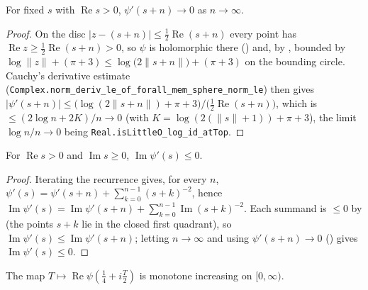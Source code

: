 \begin{lemma}
\label{lem:ga_trigamma_decay}
\leanok
{}
For fixed $s$ with $\operatorname{Re}s>0$, $\psi'(s+n)\to0$ as $n\to\infty$.
\end{lemma}

\begin{proof}
\leanok
{}
On the disc $\lvert z-(s+n)\rvert\le\tfrac12\operatorname{Re}(s+n)$ every point has
$\operatorname{Re}z\ge\tfrac12\operatorname{Re}(s+n)>0$, so $\psi$ is holomorphic there
() and, by , bounded by
$\log\lVert z\rVert+(\pi+3)\le\log\!\bigl(2\lVert s+n\rVert\bigr)+(\pi+3)$ on the bounding circle.
Cauchy's derivative estimate (\texttt{Complex.norm\_deriv\_le\_of\_forall\_mem\_sphere\_norm\_le})
then gives $\lvert\psi'(s+n)\rvert\le\bigl(\log(2\lVert s+n\rVert)+\pi+3\bigr)/\bigl(\tfrac12\operatorname{Re}(s+n)\bigr)$,
which is $\le(2\log n+2K)/n\to0$ (with $K=\log(2(\lVert s\rVert+1))+\pi+3$), the limit
$\log n/n\to0$ being \texttt{Real.isLittleO\_log\_id\_atTop}.
\end{proof}

\begin{lemma}
\label{lem:ga_im_trigamma_nonpos}
\leanok
{}
For $\operatorname{Re}s>0$ and $\operatorname{Im}s\ge0$, $\operatorname{Im}\psi'(s)\le0$.
\end{lemma}

\begin{proof}
\leanok
{}
Iterating the recurrence  gives, for every $n$,
$\psi'(s)=\psi'(s+n)+\sum_{k=0}^{n-1}(s+k)^{-2}$, hence
$\operatorname{Im}\psi'(s)=\operatorname{Im}\psi'(s+n)+\sum_{k=0}^{n-1}\operatorname{Im}(s+k)^{-2}$.
Each summand is $\le0$ by  (the points $s+k$ lie in the closed
first quadrant), so $\operatorname{Im}\psi'(s)\le\operatorname{Im}\psi'(s+n)$; letting
$n\to\infty$ and using $\psi'(s+n)\to0$ () gives
$\operatorname{Im}\psi'(s)\le0$.
\end{proof}

\begin{lemma}
\label{lem:ga_re_digamma_mono}
\leanok
{}
The map $T\mapsto\operatorname{Re}\psi\!\left(\tfrac14+i\tfrac T2\right)$ is monotone
increasing on $[0,\infty)$.
\end{lemma}

